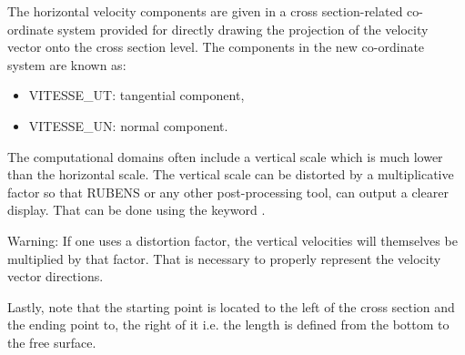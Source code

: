 The horizontal velocity components are given in a cross section-related
co-ordinate system provided for directly drawing the projection of the velocity
vector onto the cross section level. The components in the new co-ordinate
system are known as:

\begin{itemize}
\item VITESSE\_UT: tangential component,
\item VITESSE\_UN: normal component.
\end{itemize}

The  computational domains often include a vertical scale which is
much lower than the horizontal scale. The vertical scale can be distorted by a
multiplicative factor so that RUBENS or any other post-processing tool, can
output a clearer display. That can be done using the keyword .

\begin{WarningBlock}{Warning:}
If one uses a distortion factor, the vertical velocities will
themselves be multiplied by that factor. That is necessary to properly
represent the velocity vector directions.
\end{WarningBlock}

Lastly, note that the starting point is located to the left of the cross
section and the ending point to, the right of it i.e. the length is defined
from the bottom to the free surface.
